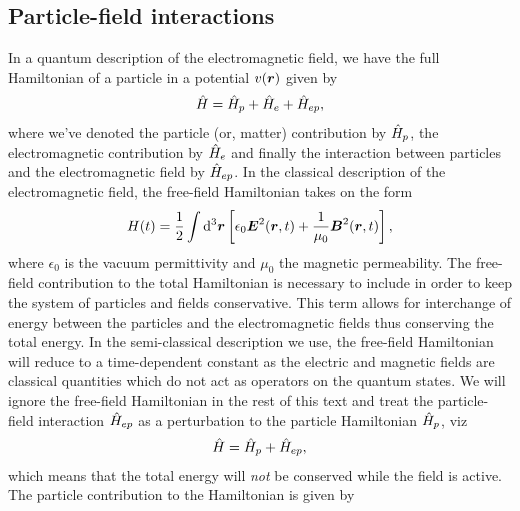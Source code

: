         \subsection{Particle-field interactions}
            In a quantum description of the electromagnetic field, we have the
            full Hamiltonian of a particle in a potential $v(\boldsymbol{r})$ given by
            \begin{align}
                \hat{H}
                = \hat{H}_{p} + \hat{H}_{e} + \hat{H}_{ep},
            \end{align}
            where we've denoted the particle (or, matter) contribution by
            $\hat{H}_p$, the electromagnetic contribution by $\hat{H}_e$ and
            finally the interaction between particles and the electromagnetic
            field by $\hat{H}_{ep}$.
            In the classical description of the electromagnetic field, the
            free-field Hamiltonian takes on the form
            \begin{align}
                H(t)
                = \frac{1}{2}\int\dd^3\boldsymbol{r} \left[ 
                    \epsilon_0 \boldsymbol{E}^2(\boldsymbol{r}, t)
                    + \frac{1}{\mu_0}\boldsymbol{B}^2(\boldsymbol{r}, t)
                 \right],
            \end{align}
            where $\epsilon_0$ is the vacuum permittivity and $\mu_0$ the
            magnetic permeability.
            The free-field contribution to the total Hamiltonian is necessary to
            include in order to keep the system of particles and fields
            conservative.
            This term allows for interchange of energy between the particles and
            the electromagnetic fields thus conserving the total energy.
            In the semi-classical description we use, the free-field Hamiltonian
            will reduce to a time-dependent constant as the electric and
            magnetic fields are classical quantities which do not act as
            operators on the quantum states.
            We will ignore the free-field Hamiltonian in the rest of this text
            and treat the particle-field interaction $\hat{H}_{ep}$ as a
            perturbation to the particle Hamiltonian $\hat{H}_{p}$, viz
            \begin{align}
                \hat{H} = \hat{H}_{p} + \hat{H}_{ep},
                \label{eq:field-free-hamiltonian}
            \end{align}
            which means that the total energy will \emph{not} be conserved
            while the field is active.
            The particle contribution to the Hamiltonian is given by
